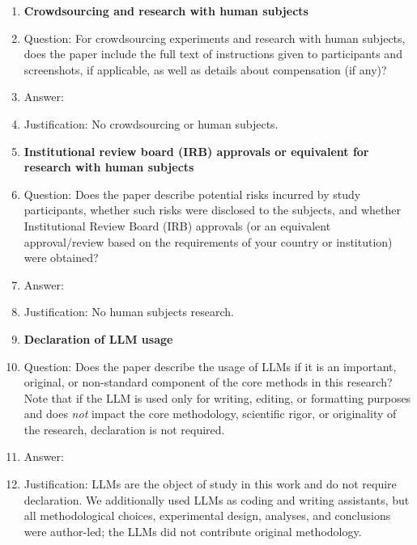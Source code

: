 \begin{enumerate}
\item {\bf Crowdsourcing and research with human subjects}
    \item[] Question: For crowdsourcing experiments and research with human subjects, does the paper include the full text of instructions given to participants and screenshots, if applicable, as well as details about compensation (if any)?
    \item[] Answer: \answerNA{}
    \item[] Justification: No crowdsourcing or human subjects.

\item {\bf Institutional review board (IRB) approvals or equivalent for research with human subjects}
    \item[] Question: Does the paper describe potential risks incurred by study participants, whether such risks were disclosed to the subjects, and whether Institutional Review Board (IRB) approvals (or an equivalent approval/review based on the requirements of your country or institution) were obtained?
    \item[] Answer: \answerNA{}
    \item[] Justification: No human subjects research.

\item {\bf Declaration of LLM usage}
    \item[] Question: Does the paper describe the usage of LLMs if it is an important, original, or non-standard component of the core methods in this research? Note that if the LLM is used only for writing, editing, or formatting purposes and does \emph{not} impact the core methodology, scientific rigor, or originality of the research, declaration is not required.
    \item[] Answer: \answerNA{}
    \item[] Justification: LLMs are the object of study in this work and do not require declaration. We additionally used LLMs as coding and writing assistants, but all methodological choices, experimental design, analyses, and conclusions were author-led; the LLMs did not contribute original methodology.

\end{enumerate}
